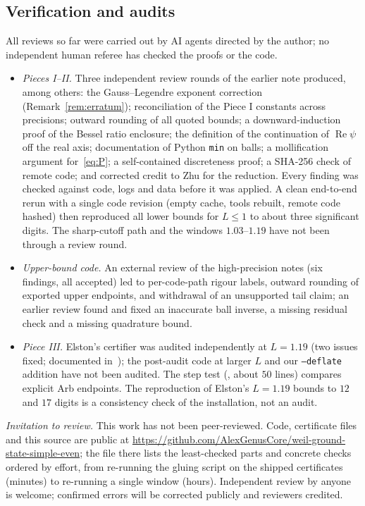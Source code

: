 \documentclass[11pt]{amsart}
\newcommand{\re}{\operatorname{Re}}
\newcommand{\file}[1]{{\small\path{#1}}}
\theoremstyle{definition}
\theoremstyle{remark}
\numberwithin{equation}{section}
\begin{document}
\subsection{Verification and audits}
All reviews so far were carried out by AI agents directed by the author; no independent human referee has checked the proofs or the code.
\begin{itemize}
\item \emph{Pieces I--II.} Three independent review rounds of the earlier note produced, among others: the Gauss--Legendre exponent correction (Remark~\ref{rem:erratum}); reconciliation of the Piece I constants across precisions; outward rounding of all quoted bounds; a downward-induction proof of the Bessel ratio enclosure; the definition of the continuation of $\re\psi$ off the real axis; documentation of Python \texttt{min} on balls; a mollification argument for~\eqref{eq:P}; a self-contained discreteness proof; a SHA-256 check of remote code; and corrected credit to Zhu for the reduction. Every finding was checked against code, logs and data before it was applied. A clean end-to-end rerun with a single code revision (empty cache, tools rebuilt, remote code hashed) then reproduced all lower bounds for $L\le1$ to about three significant digits. The sharp-cutoff path and the windows $1.03$--$1.19$ have not been through a review round.
\item \emph{Upper-bound code.} An external review of the high-precision notes (six findings, all accepted) led to per-code-path rigour labels, outward rounding of exported upper endpoints, and withdrawal of an unsupported tail claim; an earlier review found and fixed an inaccurate ball inverse, a missing residual check and a missing quadrature bound.
\item \emph{Piece III.} Elston's certifier was audited independently at $L=1.19$ (two issues fixed; documented in~\cite{Elston}); the post-audit code at larger $L$ and our \texttt{--deflate} addition have not been audited. The step test (\file{code/gap/check_steps.py}, about $50$ lines) compares explicit Arb endpoints. The reproduction of Elston's $L=1.19$ bounds to $12$ and $17$ digits is a consistency check of the installation, not an audit.
\end{itemize}
\emph{Invitation to review.} This work has not been peer-reviewed. Code, certificate files and this source are public at \url{https://github.com/AlexGenusCore/weil-ground-state-simple-even}; the file \file{REVIEWING.md} there lists the least-checked parts and concrete checks ordered by effort, from re-running the gluing script on the shipped certificates (minutes) to re-running a single window (hours). Independent review by anyone is welcome; confirmed errors will be corrected publicly and reviewers credited.
\end{document}
